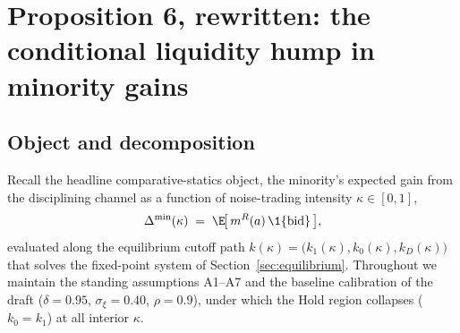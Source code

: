 %
%
%

\section*{Proposition 6, rewritten: the conditional liquidity hump in minority gains}

\subsection*{Object and decomposition}

Recall the headline comparative-statics object, the minority's expected gain
from the disciplining channel as a function of noise-trading intensity
$\kappa\in[0,1]$,
\begin{equation}
  \Delta^{\min}(\kappa)
  \;=\;
  \E\!\big[\, m^{R}(a)\,\1\{\text{bid}\} \,\big],
  \label{eq:dmin-def}
\end{equation}
evaluated along the equilibrium cutoff path
$k(\kappa)=\big(k_1(\kappa),k_0(\kappa),k_D(\kappa)\big)$ that solves the
fixed-point system of Section~\ref{sec:equilibrium}. Throughout we maintain the
standing assumptions A1--A7 and the baseline calibration of the draft
($\delta=0.95$, $\sigma_\xi=0.40$, $\rho=0.9$), under which the Hold region
collapses ($k_0=k_1$) at all interior $\kappa$.

